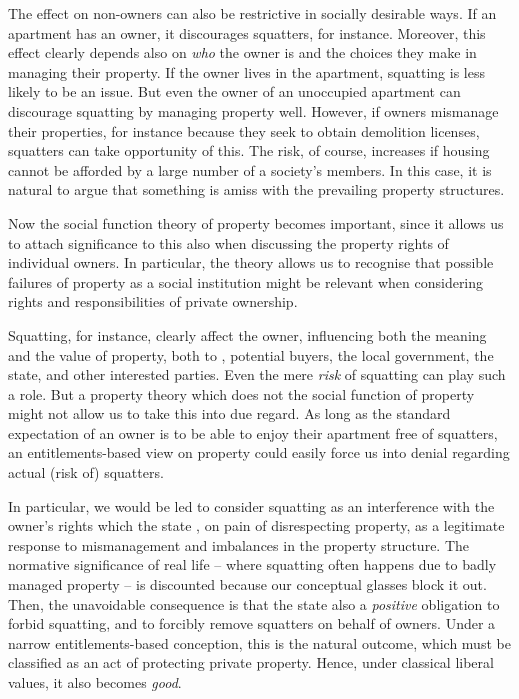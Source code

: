 The effect on non-owners can also be restrictive in socially desirable ways. If an apartment has an owner, it discourages squatters, for instance. Moreover, this effect clearly depends also on {\it who} the owner is and the choices they make in managing their property. If the owner lives in the apartment, squatting is less likely to be an issue. But even the owner of an unoccupied apartment can discourage squatting by managing  property well. However, if owners mismanage their properties, for instance because they seek to obtain demolition licenses, squatters can take opportunity of this. The risk, of course, increases if housing cannot be afforded by a large number of a society's members. In this case, it is natural to argue that something is amiss with the prevailing property structures.

Now the social function theory of property becomes important, since it allows us to attach significance to this also when discussing the property rights of individual owners. In particular, the theory allows us to recognise that possible failures of property as a social institution might be relevant when considering rights and responsibilities of private ownership.

Squatting, for instance, clearly affect the owner, influencing both the meaning and the value of  property, both to , potential buyers, the local government, the state, and other interested parties. Even the mere {\it risk} of squatting can play such a role. But a property theory which does not  the social function of property might not allow us to take this into due regard. As long as the standard expectation of an owner is to be able to enjoy their apartment free of squatters, an entitlements-based view on property could easily force us into denial regarding actual (risk of) squatters.

In particular, we would be led to consider squatting as an interference with the owner's rights which the state , on pain of disrespecting property,  as a legitimate response to mismanagement and imbalances in the property structure. The normative significance of real life -- where squatting often happens due to badly managed property -- is discounted because our conceptual glasses block it out. Then, the unavoidable consequence is that the state also  a {\it positive} obligation to forbid squatting, and to forcibly remove squatters on behalf of owners. Under a narrow entitlements-based conception, this is the natural outcome, which must be classified as an act of protecting private property. Hence, under classical liberal values, it also becomes {\it good}. 

